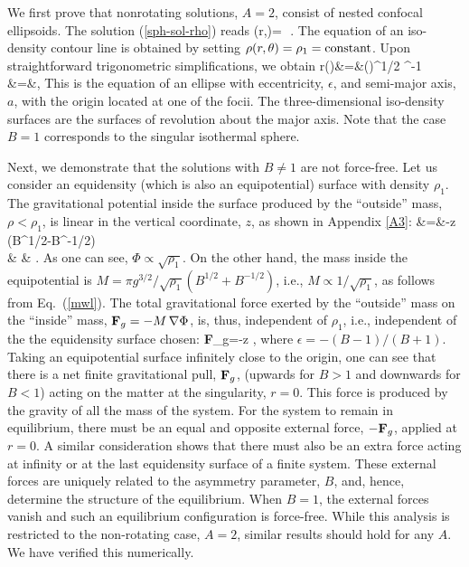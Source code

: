 We first prove that nonrotating solutions, $A=2$, consist of nested confocal 
ellipsoids. The solution (\ref{sph-sol-rho}) reads
\beq
\rho(r,\theta)=\,\,
 .
\label{ellips}
\eeq
The equation of an iso-density contour line is obtained 
by setting $\rho(r,\theta)=\rho_1={\rm constant}$. Upon
straightforward trigonometric simplifications, we obtain
\bea
r(\theta)&=&\left(\right)^{1/2}
^{-1} \nonumber\\
&=&,
\eea
This is the equation of an ellipse with eccentricity, $\epsilon$, and  
semi-major axis, $a$, with the origin located at one of the focii. 
The three-dimensional iso-density surfaces are 
the surfaces of revolution about the major axis.
Note that the case $B=1$ corresponds to the singular isothermal sphere.

Next, we demonstrate that the solutions with $B\not=1$ are not force-free. 
Let us consider an equidensity (which is also an equipotential) surface with 
density $\rho_1$. The gravitational potential inside the surface 
produced by the ``outside'' mass, $\rho<\rho_1$, is linear in the 
vertical coordinate, $z$, as shown in Appendix \ref{A3}:
\bea
\Phi&=&-z\;\,\left(B^{1/2}-B^{-1/2}\right)
\nonumber \\
& &{ }\quad\times
{}.
\label{extra-pot}
\eea
As one can see, $\Phi\propto\sqrt{\rho_1}$. On the other hand, the mass inside 
the equipotential is 
$M=\pi g^{3/2}/\sqrt{\rho_1}\left(B^{1/2}+B^{-1/2}\right)$, i.e.,
$M\propto1/\sqrt{\rho_1}$, as follows from Eq.\ (\ref{mwl}). The total
gravitational force exerted by the ``outside'' mass on the ``inside'' mass,
${\bf F}_g=-M\,\nabla\Phi$, is, thus, independent of $\rho_1$, i.e.,
independent of the the equidensity surface chosen:
\beq
{\bf F}_g=-\hat z\;\;
,
\label{force}
\eeq
where $\epsilon=-(B-1)/(B+1)$. Taking an equipotential surface infinitely 
close to the origin, one can see that there is a net finite gravitational 
pull, ${\bf F}_g$, (upwards for $B>1$ and downwards for $B<1$) acting on the 
matter at the singularity, $r=0$. This force is produced by the gravity of all
the mass of the system. For the system to remain in equilibrium, there must be 
an equal and opposite external force, $-{\bf F}_g$, applied at $r=0$. 
A similar consideration shows that there must also be 
an extra force acting at infinity or at the last equidensity surface of a
finite system. These external forces are uniquely related to the asymmetry 
parameter, $B$, and,
hence, determine the structure of the equilibrium. When $B=1$, the external
forces vanish and such an equilibrium configuration is force-free.
While this analysis is restricted to the non-rotating case, $A=2$, 
similar results should hold for any $A$. We have verified this numerically.

